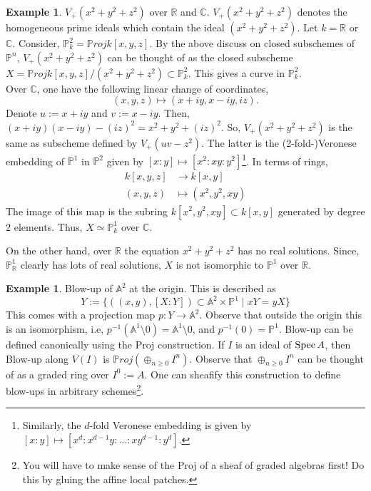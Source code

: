 \documentclass[11pt]{amsart}
\newcommand{\Proj}{{\P roj}}
\newcommand{\Spec}{{\rm Spec \,}}
\newcommand{\A}{{\mathbb A}}
\newcommand{\C}{{\mathbb C}}
\renewcommand{\P}{{\mathbb P}}
\newcommand{\R}{{\mathbb R}}
\theoremstyle{definition}
\newtheorem{example}[theorem]{Example}
\begin{document}
\begin{example}
$V_{+}(x^2+y^2+z^2)$ over $\R$ and $\C$. $V_{+}(x^2+y^2+z^2)$ denotes the homogeneous prime ideals which contain the ideal $(x^2+y^2+z^2)$. Let $k=\R$ or $\C$. Consider, $\P_k^2=\Proj k[x,y,z]$. By the above discuss on closed subschemes of $\P^n$, $V_{+}(x^2+y^2+z^2)$ can be thought of as the closed subscheme $X=\Proj k[x,y,z]/(x^2+y^2+z^2)\subset \P_k^2$. This gives a curve in $\P_k^2$.\\
Over $\C$, one have the following linear change of coordinates, 
\[(x,y,z)\mapsto (x+iy,x-iy,iz).\] 
Denote $u:=x+iy$ and $v:=x-iy$. Then, $(x+iy) (x-iy) -(iz)^2= x^2+y^2+(iz)^2$. So, $V_{+}(x^2+y^2+z^2)$ is the same as subscheme defined by $V_+(uv-z^2)$. The latter is the (2-fold-)Veronese embedding of $\P^1$ in $\P^2$ given by $[x:y]\mapsto [x^2:xy:y^2]$\footnote{Similarly, the $d$-fold Veronese embedding is given by $[x:y]\mapsto [x^d:x^{d-1}y:\ldots:xy^{d-1}:y^d]$.}. In terms of rings,
\begin{align*}
k[x,y,z]&\rightarrow k[x,y]\\
(x,y,z)&\mapsto (x^2,y^2,xy)
\end{align*}
The image of this map is the subring $k[x^2,y^2,xy]\subset k[x,y]$ generated by degree $2$ elements. Thus, $X\simeq \P_{k}^1$ over $\C$.

On the other hand, over $\R$ the equation $x^2+y^2+z^2$ has no real solutions. Since, $\P_{\R}^1$ clearly has lots of real solutions, $X$ is not isomorphic to $\P^1$ over $\R$.
\end{example}


\begin{example}
	Blow-up of $\A^2$ at the origin. This is described as 
	\[Y:=\lbrace ((x,y),[X:Y])\subset \A^2\times\P^1\; |\; xY=yX\rbrace\]
	This comes with a projection map $p: Y\rightarrow \A^2$. Observe that outside the origin this is an isomorphism, i.e, $p^{-1}(\A^1\setminus 0)=\A^1\setminus 0$, and $p^{-1}(0)=\P^1$. Blow-up can be defined canonically using the Proj construction. If $I$ is an ideal of $\Spec A$, then Blow-up along $V(I)$ is $\Proj(\oplus_{n\geq 0}I^n)$. Observe that $\oplus_{n\geq 0}I^n$ can be thought of as a graded ring over $I^0:= A$. One can sheafify this construction to define blow-ups in arbitrary schemes\footnote{You will have to make sense of the Proj of a sheaf of graded algebras first! Do this by gluing the affine local patches.}.%
	
\end{example}
\end{document}

